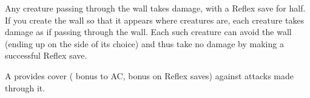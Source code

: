\spellrng{\rngmed}
\begin{spelleffect}
  Any creature passing through the wall takes damage, with a Reflex save for half. If you create the wall so that it appears where creatures are, each creature takes damage as if passing through the wall. Each such creature can avoid the wall (ending up on the side of its choice) and thus take no damage by making a successful Reflex save.
  \par A  provides cover ( bonus to AC,  bonus on Reflex saves) against attacks made through it.
\end{spelleffect}

